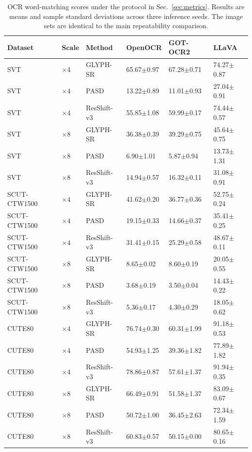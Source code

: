 \begin{table}[H]
\centering
\caption{OCR word-matching scores under the protocol in Sec.~\ref{sec:metrics}. Results are means and sample standard deviations across three inference seeds. The image sets are identical to the main repeatability comparison.}
\label{tab:ar-main-f1}
\small
\setlength{\tabcolsep}{4pt}
\begin{tabular}{llllll}
\toprule
Dataset & Scale & Method & OpenOCR & GOT-OCR2 & LLaVA \\
\midrule
SVT & $\times4$ & GLYPH-SR & 65.67$\pm$0.97 & 67.28$\pm$0.71 & 74.27$\pm$0.87 \\
SVT & $\times4$ & PASD & 13.22$\pm$0.89 & 11.01$\pm$0.93 & 27.04$\pm$0.91 \\
SVT & $\times4$ & ResShift-v3 & 55.85$\pm$1.08 & 59.99$\pm$0.17 & 74.44$\pm$0.57 \\
SVT & $\times8$ & GLYPH-SR & 36.38$\pm$0.39 & 39.29$\pm$0.75 & 45.64$\pm$0.75 \\
SVT & $\times8$ & PASD & 6.90$\pm$1.01 & 5.87$\pm$0.94 & 13.73$\pm$1.31 \\
SVT & $\times8$ & ResShift-v3 & 14.94$\pm$0.57 & 16.32$\pm$0.11 & 31.08$\pm$0.91 \\
SCUT-CTW1500 & $\times4$ & GLYPH-SR & 41.62$\pm$0.20 & 36.77$\pm$0.36 & 52.75$\pm$0.24 \\
SCUT-CTW1500 & $\times4$ & PASD & 19.15$\pm$0.33 & 14.66$\pm$0.37 & 35.41$\pm$0.25 \\
SCUT-CTW1500 & $\times4$ & ResShift-v3 & 31.41$\pm$0.15 & 25.29$\pm$0.58 & 48.67$\pm$0.11 \\
SCUT-CTW1500 & $\times8$ & GLYPH-SR & 8.65$\pm$0.02 & 8.60$\pm$0.19 & 20.05$\pm$0.55 \\
SCUT-CTW1500 & $\times8$ & PASD & 3.68$\pm$0.19 & 3.50$\pm$0.04 & 14.43$\pm$0.22 \\
SCUT-CTW1500 & $\times8$ & ResShift-v3 & 5.36$\pm$0.17 & 4.30$\pm$0.29 & 18.05$\pm$0.62 \\
CUTE80 & $\times4$ & GLYPH-SR & 76.74$\pm$0.30 & 60.31$\pm$1.99 & 91.18$\pm$0.53 \\
CUTE80 & $\times4$ & PASD & 54.93$\pm$1.25 & 39.36$\pm$1.82 & 77.89$\pm$1.82 \\
CUTE80 & $\times4$ & ResShift-v3 & 78.86$\pm$0.87 & 57.61$\pm$1.37 & 91.94$\pm$0.35 \\
CUTE80 & $\times8$ & GLYPH-SR & 66.49$\pm$0.91 & 51.58$\pm$1.37 & 83.09$\pm$0.67 \\
CUTE80 & $\times8$ & PASD & 50.72$\pm$1.00 & 36.45$\pm$2.63 & 72.34$\pm$1.59 \\
CUTE80 & $\times8$ & ResShift-v3 & 60.83$\pm$0.57 & 50.15$\pm$0.00 & 80.65$\pm$0.16 \\
\bottomrule
\end{tabular}
\end{table}
